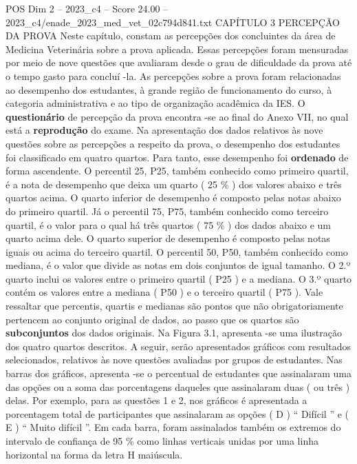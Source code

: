 \begin{textsample}{POS Dim 2 – 2023\_c4 – Score 24.00 – 2023\_c4/enade\_2023\_med\_vet\_02c794d841.txt}  \label{ex:f2_pos_007}
CAPÍTULO 3 PERCEPÇÃO DA PROVA Neste capítulo, constam as percepções dos concluintes da área de Medicina Veterinária sobre a prova aplicada.
Essas percepções foram mensuradas por meio de nove questões que avaliaram desde o grau de dificuldade da prova até o tempo gasto para concluí -la.
As percepções sobre a prova foram relacionadas ao desempenho dos estudantes, à grande região de funcionamento do curso, à categoria administrativa e ao tipo de organização acadêmica da IES.
O \textbf{questionário} de percepção da prova encontra -se ao final do Anexo VII, no qual está a \textbf{reprodução} do exame.
Na apresentação dos dados relativos às nove questões sobre as percepções a respeito da prova, o desempenho dos estudantes foi classificado em quatro quartos.
Para tanto, esse desempenho foi \textbf{ordenado} de forma ascendente.
O percentil 25, P25, também conhecido como primeiro quartil, é a nota de desempenho que deixa um quarto ( 25 \% ) dos valores abaixo e três quartos acima.
O quarto inferior de desempenho é composto pelas notas abaixo do primeiro quartil.
Já o percentil 75, P75, também conhecido como terceiro quartil, é o valor para o qual há três quartos ( 75 \% ) dos dados abaixo e um quarto acima dele.
O quarto superior de desempenho é composto pelas notas iguais ou acima do terceiro quartil.
O percentil 50, P50, também conhecido como mediana, é o valor que divide as notas em dois conjuntos de igual tamanho.
O 2.º quarto inclui os valores entre o primeiro quartil ( P25 ) e a mediana.
O 3.º quarto contém os valores entre a mediana ( P50 ) e o terceiro quartil ( P75 ).
Vale ressaltar que percentis, quartis e medianas são pontos que não obrigatoriamente pertencem ao conjunto original de dados, ao passo que os quartos são \textbf{subconjuntos} dos dados originais.
Na Figura 3.1, apresenta -se uma ilustração dos quatro quartos descritos.
A seguir, serão apresentados gráficos com resultados selecionados, relativos às nove questões avaliadas por grupos de estudantes.
Nas barras dos gráficos, apresenta -se o percentual de estudantes que assinalaram uma das opções ou a soma das porcentagens daqueles que assinalaram duas ( ou três ) delas.
Por exemplo, para as questões 1 e 2, nos gráficos é apresentada a porcentagem total de participantes que assinalaram as opções ( D ) “ Difícil ” e ( E ) “ Muito difícil ”.
Em cada barra, foram assinalados também os extremos do intervalo de confiança de 95 \% como linhas verticais unidas por uma linha horizontal na forma da letra H maiúscula.

\end{textsample}
